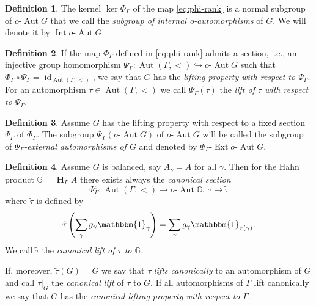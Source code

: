 \documentclass[12pt,a4paper,reqno,openright]{amsart}
\newcommand{\bbG}{{\mathbb G}}
\renewcommand{\1}{\mathbbm{1}}
\newcommand{\G}{\Gamma}
\DeclareMathOperator{\id}{id}
\DeclareMathOperator{\Aut}{Aut}
\DeclareMathOperator{\Ext}{Ext}
\DeclareMathOperator{\Int}{Int}
\newcommand{\oAut}{o\text{-}\Aut}
\newcommand{\GG}{\bbG}
\DeclareMathOperator*\HH{\mathbf{H}}
\theoremstyle{definition}
\newtheorem{defn}{Definition}[section]
\theoremstyle{plain}
\theoremstyle{plain}
\theoremstyle{plain}
\theoremstyle{plain}
\theoremstyle{plain}
\theoremstyle{plain}
\theoremstyle{plain}
\theoremstyle{plain}
\theoremstyle{definition}
\theoremstyle{definition}
\theoremstyle{plain}
\theoremstyle{definition}
\theoremstyle{definition}
\theoremstyle{plain}
\theoremstyle{plain}
\theoremstyle{plain}
\begin{document}
\begin{defn}
	\label{def:rank-int}
	The kernel $ \ker\Phi_\Gamma $ of the map \eqref{eq:phi-rank}
	is a normal subgroup of $ \oAut G $ that we call the
	\emph{subgroup of internal o-automorphisms} of $G$.
	We will denote it  by $\Int\oAut G$.
\end{defn}
\begin{defn}\label{def:lifting-property-rank}
If the map $ \Phi_\Gamma $ defined in \eqref{eq:phi-rank} admits a section, i.e., an injective group homomorphism $ \Psi_\Gamma\colon \Aut(\G, <)\hookrightarrow \oAut G $ such that $ \Phi_\Gamma\circ\Psi_\Gamma = \id_{\Aut(\G, <)} $, we say that $ G $ has 	the \emph{lifting property with respect to $ \Psi_\Gamma $}.\\
For an automorphism $\tau \in \Aut(\G, <)$ we call $ \Psi_\Gamma(\tau) $ the \emph{lift of $ \tau $ with respect to $ \Psi_\Gamma $}.

\end{defn}
\begin{defn}
	\label{def:rank-ext}
	Assume $ G $ has the lifting property with respect to a fixed section $ \Psi_\Gamma $ of $ \Phi_\Gamma $.
	The subgroup $ \Psi_\Gamma(\oAut G) $ of $ \oAut G $ will be called the subgroup of $ \Psi_\Gamma $\emph{-external automorphisms of $G$} and denoted by ${\Psi_\Gamma}\text{-}\Ext\oAut G$.
\end{defn}
\begin{defn}\label{def:can-lift-prop-rank}
Assume $ G $ is balanced, say $ A_\gamma = A $ for all $ \gamma $. Then for the Hahn product $ \GG = \HH_\Gamma A $ there exists always the \emph{canonical section}
\[
\Psi^c_\Gamma\colon \Aut(\G, <)\to \oAut \GG,\ \tau\longmapsto \tilde\tau
\]
where $ \tilde\tau $ is defined by
\[
\tilde\tau\left( \sum_\gamma g_\gamma\1_\gamma\right) = \sum_\gamma g_\gamma\1_{\tau(\gamma)}.
\]
We call $ \tilde\tau $ the \emph{canonical lift of $ \tau $ to $ \GG $.}

\noindent If, moreover, $ \tilde\tau(G) = G $ we say that $ \tau $ \emph{lifts canonically} to an automorphism of $ G $ and call $ \tilde\tau|_G $ the \emph{canonical lift} of $ \tau $ to $ G $. If all automorphisms of $ \Gamma $ lift canonically we say that $ G $ has the \emph{canonical lifting property with respect to} $ \Gamma $.
\end{defn}
\end{document}
